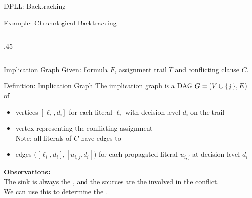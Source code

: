 \documentclass[t]{sdqbeamer2}
\begin{document}
\begin{frame}{DPLL: Backtracking}
\begin{exampleblock}{Example: Chronological Backtracking}
\begin{columns}[T]
\begin{column}{.45\textwidth}
\end{column}
\end{columns}
\end{exampleblock}
\end{frame}


\begin{frame}{Implication Graph}
Given: Formula $F$, assignment trail $T$ and conflicting clause $C$.

\begin{block}{Definition: Implication Graph}
The implication graph is a DAG $G=(V \cup \{ \text{\ensuremath{\lightning}} \},E)$ of \\[1ex]
\begin{itemize}\setlength{\itemsep}{1em}
	\item vertices $[\ell_i,d_i]$ for each literal $\ell_i$ with decision level $d_i$ on the trail
	\item vertex \blitz{} representing the conflicting assignment\\[1ex] Note: all literals of $C$ have edges to \blitz{}
	\item edges $\bigl([\ell_i, d_i], [u_{i,j}, d_i]\bigr)$ for each propagated literal $u_{i,j}$ at decision level $d_i$
\end{itemize}
\end{block}
\textbf{Observations:}\\[1ex]
The sink is always the , and the sources are the  involved in the conflict.\\[1ex]
We can use this to determine the .
\end{frame}
\end{document}
